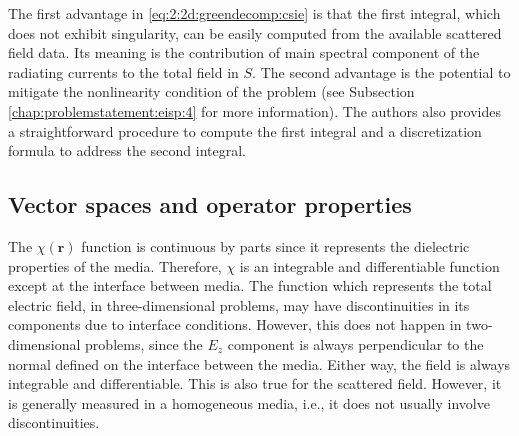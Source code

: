 			The first advantage in \eqref{eq:2:2d:greendecomp:csie} is that the first integral, which does not exhibit singularity, can be easily computed from the available scattered field data. Its meaning is the contribution of main spectral component of the radiating currents to the total field in $S$. The second advantage is the potential to mitigate the nonlinearity condition of the problem (see Subsection \ref{chap:problemstatement:eisp:4} for more information). The authors also provides a straightforward procedure to compute the first integral and a discretization formula to address the second integral.
		
		\subsection{Vector spaces and operator properties}\label{chap:problemstatement:eisp:3}
		
			The $\chi(\mathbf{r})$ function is continuous by parts since it represents the dielectric properties of the media. Therefore, $\chi$ is an integrable and differentiable function except at the interface between media. The function which represents the total electric field, in three-dimensional problems, may have discontinuities in its components due to interface conditions. However, this does not happen in two-dimensional problems, since the $E_z$ component is always perpendicular to the normal defined on the interface between the media. Either way, the field is always integrable and differentiable. This is also true for the scattered field. However, it is generally measured in a homogeneous media, i.e., it does not usually involve discontinuities.
			
